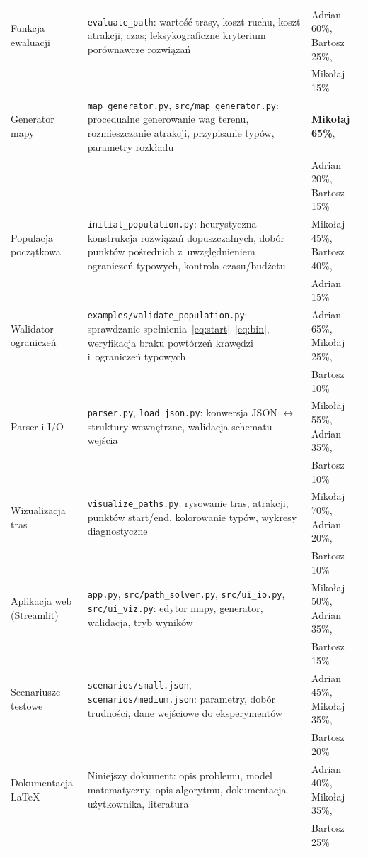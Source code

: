 \begin{longtable}{p{4.4cm} p{5.6cm} p{4.4cm}}
Funkcja ewaluacji
& \texttt{evaluate\_path}: wartość trasy, koszt ruchu, koszt atrakcji,
  czas; leksykograficzne kryterium porównawcze rozwiązań
& Adrian 60\%, Bartosz 25\%, \\[-2pt]
& & Mikołaj 15\% \\[4pt]

Generator mapy
& \texttt{map\_generator.py}, \texttt{src/map\_generator.py}:
  procedualne generowanie wag terenu, rozmieszczanie atrakcji,
  przypisanie typów, parametry rozkładu
& \textbf{Mikołaj 65\%}, \\[-2pt]
& & Adrian 20\%, Bartosz 15\% \\[4pt]

Populacja początkowa
& \texttt{initial\_population.py}: heurystyczna konstrukcja rozwiązań
  dopuszczalnych, dobór punktów pośrednich z~uwzględnieniem
  ograniczeń typowych, kontrola czasu/budżetu
& Mikołaj 45\%, Bartosz 40\%, \\[-2pt]
& & Adrian 15\% \\[4pt]

Walidator ograniczeń
& \texttt{examples/validate\_population.py}: sprawdzanie
  spełnienia~\eqref{eq:start}--\eqref{eq:bin}, weryfikacja braku
  powtórzeń krawędzi i~ograniczeń typowych
& Adrian 65\%, Mikołaj 25\%, \\[-2pt]
& & Bartosz 10\% \\[4pt]

Parser i I/O
& \texttt{parser.py}, \texttt{load\_json.py}: konwersja JSON $\leftrightarrow$
  struktury wewnętrzne, walidacja schematu wejścia
& Mikołaj 55\%, Adrian 35\%, \\[-2pt]
& & Bartosz 10\% \\[4pt]

Wizualizacja tras
& \texttt{visualize\_paths.py}: rysowanie tras, atrakcji, punktów
  start/end, kolorowanie typów, wykresy diagnostyczne
& Mikołaj 70\%, Adrian 20\%, \\[-2pt]
& & Bartosz 10\% \\[4pt]

Aplikacja web (Streamlit)
& \texttt{app.py}, \texttt{src/path\_solver.py}, \texttt{src/ui\_io.py},
  \texttt{src/ui\_viz.py}: edytor mapy, generator, walidacja,
  tryb wyników
& Mikołaj 50\%, Adrian 35\%, \\[-2pt]
& & Bartosz 15\% \\[4pt]

Scenariusze testowe
& \texttt{scenarios/small.json}, \texttt{scenarios/medium.json}:
  parametry, dobór trudności, dane wejściowe do eksperymentów
& Adrian 45\%, Mikołaj 35\%, \\[-2pt]
& & Bartosz 20\% \\[4pt]

Dokumentacja LaTeX
& Niniejszy dokument: opis problemu, model matematyczny, opis
  algorytmu, dokumentacja użytkownika, literatura
& Adrian 40\%, Mikołaj 35\%, \\[-2pt]
& & Bartosz 25\% \\

\bottomrule
\end{longtable}

